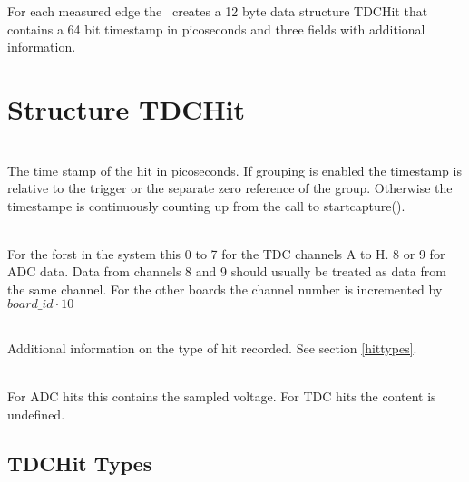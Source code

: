 For each measured edge the \deviceName\ creates a 12 byte data structure TDCHit that contains a 64 bit timestamp in picoseconds and three fields with additional information. 

\section{Structure TDCHit}
\label{TDCHit}
\\
The time stamp of the hit in picoseconds. If grouping is enabled the timestamp is relative to the trigger or the separate zero reference of the group. 
Otherwise the timestampe is continuously counting up from the call to \textsf{start\tu capture()}.

\\
For the forst in the system this 0 to 7 for the TDC channels A to H. 8 or 9 for ADC data. Data from channels 8 and 9 should usually be treated as data from the same channel. 
For the other boards the channel number is incremented by $board\_id \cdot 10$

\\
Additional information on the type of hit recorded. See section \ref{hittypes}.

\\
For ADC hits this contains the sampled voltage. For TDC hits the content is undefined.

\newpage
\subsection{TDCHit Types \label{hittypes}}
\newcommand{\HTYPE}{\PREFIX TDCHIT\tu TYPE\tu}

